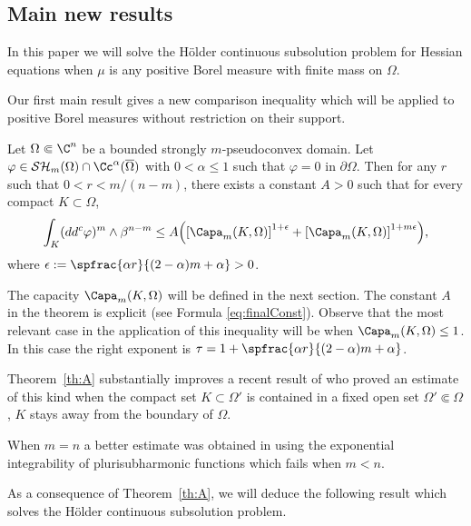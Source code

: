 \subsection{Main new results}

In this paper we will solve the Hölder continuous subsolution problem for Hessian equations when $\mu$ is any positive Borel measure with finite mass on $\Omega$.

Our first main result gives a new comparison inequality which will be applied to positive Borel measures without restriction on their support.

\begin{theo}\label{th:A}
Let $\Omega \Subset \C^n$ be a bounded strongly $m$-pseudoconvex domain.
Let $\varphi\in \mathcal{SH}_m(\Omega)\cap \Cc^{\alpha}(\overline\Omega)$ with $0 < \alpha \leq 1$ such that $\varphi = 0$ in $\partial \Omega$. Then for any $r$ such that $0 < r < m \slash (n-m)$, there exists a constant $A>0$ such that for every compact $K\subset\Omega$,
\[
\int_ K (dd^c\varphi)^m\wedge\beta^{n-m} \leq A\Bigl(\left[\Capa_m (K,\Omega)\right]^{1 + \epsilon} + \left[\Capa_m (K,\Omega)\right]^{1 + m\epsilon}\Bigr),
\]
where $\epsilon:= \spfrac{\alpha r}{(2-\alpha) m + \alpha} > 0$.
\end{theo}

The capacity $\Capa_m (K,\Omega)$ will be defined in the next section. The constant $A$ in the theorem is explicit (see Formula \eqref{eq:finalConst}). Observe that the most relevant case in the application of this inequality will be when $\Capa_m (K,\Omega) \leq 1$. In this case the right exponent is $\tau = 1 + \spfrac{\alpha r}{(2-\alpha) m + \alpha}$.

Theorem~\ref{th:A} substantially improves a recent result of \cite{KN19} who proved an estimate of this kind when the compact set $K \subset \Omega'$ is contained in a fixed open set $\Omega' \Subset \Omega$, \ie $K$ stays away from the boundary of $\Omega$.

When $m=n$ a better estimate was obtained in \cite{N18a} using the exponential integrability of plurisubharmonic functions which fails when $m < n$.

As a consequence of Theorem~\ref{th:A}, we will deduce the following result which solves the Hölder continuous subsolution problem.

